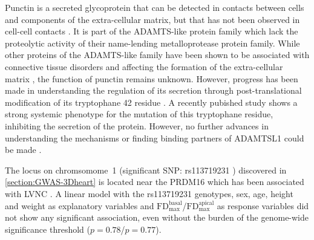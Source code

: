 %
Punctin is a secreted glycoprotein that can be detected in contacts between cells and components of the extra-cellular matrix, but that has not been observed in cell-cell contacts \citep{Hirohata2002}. It is part of the ADAMTS-like protein family which lack the proteolytic activity of their name-lending metalloprotease protein family. While other proteins of the ADAMTS-like family have been shown to be associated with connective tissue disorders and affecting the formation of the extra-cellular matrix \citep{Ahram2009,Hubmacher2015}, the function of punctin remains unknown. However, progress has been made in understanding the regulation of its secretion through post-translational modification of its tryptophane \num{42} residue \citep{Wang2009}. A recently pubished study shows a strong systemic phenotype for the mutation of this tryptophane residue, inhibiting the secretion of the protein. However, no further advances in understanding the mechanisms or finding binding partners of ADAMTSL1 could be made \citep{Hendee2017}.

The locus on chromsomome~1 (significant SNP: rs113719231 ) discovered in \cref{section:GWAS-3Dheart} is located near the PRDM16 which has been associated with LVNC \citep{Arndt2013}. A linear model with the rs113719231 genotypes, sex, age, height and weight as explanatory variables and \(\text{FD}_\text{max}^\text{basal}\)/\(\text{FD}_\text{max}^\text{apical}\) as response variables did not show any significant association, even without the burden of the genome-wide significance threshold (\(p = 0.78\)/\(p = 0.77\)).


